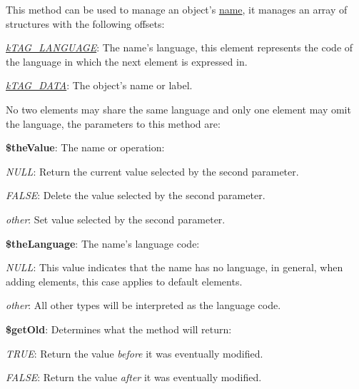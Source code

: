 This method can be used to manage an object's \hyperlink{}{name}, it manages an array of structures with the following offsets\-:


\begin{DoxyItemize}
\item {\itshape \hyperlink{}{k\-T\-A\-G\-\_\-\-L\-A\-N\-G\-U\-A\-G\-E}}\-: The name's language, this element represents the code of the language in which the next element is expressed in. 
\item {\itshape \hyperlink{}{k\-T\-A\-G\-\_\-\-D\-A\-T\-A}}\-: The object's name or label. 
\end{DoxyItemize}

No two elements may share the same language and only one element may omit the language, the parameters to this method are\-:


\begin{DoxyItemize}
\item {\bfseries \$the\-Value}\-: The name or operation\-: 
\begin{DoxyItemize}
\item {\itshape N\-U\-L\-L}\-: Return the current value selected by the second parameter. 
\item {\itshape F\-A\-L\-S\-E}\-: Delete the value selected by the second parameter. 
\item {\itshape other}\-: Set value selected by the second parameter. 
\end{DoxyItemize}
\item {\bfseries \$the\-Language}\-: The name's language code\-: 
\begin{DoxyItemize}
\item {\itshape N\-U\-L\-L}\-: This value indicates that the name has no language, in general, when adding elements, this case applies to default elements. 
\item {\itshape other}\-: All other types will be interpreted as the language code. 
\end{DoxyItemize}
\item {\bfseries \$get\-Old}\-: Determines what the method will return\-: 
\begin{DoxyItemize}
\item {\itshape T\-R\-U\-E}\-: Return the value {\itshape before} it was eventually modified. 
\item {\itshape F\-A\-L\-S\-E}\-: Return the value {\itshape after} it was eventually modified. 
\end{DoxyItemize}
\end{DoxyItemize}



